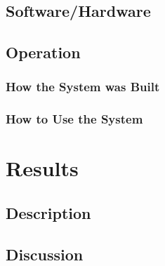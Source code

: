 \documentclass[journal]{IEEEtran}
\begin{document}
\subsection{Software/Hardware}

\subsection{Operation}

\subsubsection{How the System was Built}

\subsubsection{How to Use the System}

\section{Results}
\subsection{Description}
\subsection{Discussion}



\end{document}

